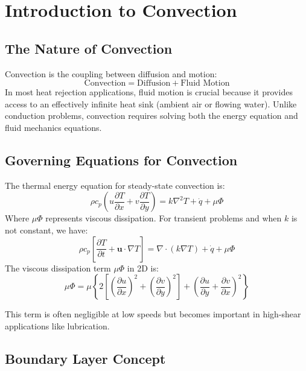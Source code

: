 \section*{Introduction to Convection}
\subsection*{The Nature of Convection}
Convection is the coupling between diffusion and motion:
\[
\text{Convection} = \text{Diffusion} + \text{Fluid Motion}
\]
%
In most heat rejection applications, fluid motion is crucial because it provides access to an effectively infinite heat sink (ambient air or flowing water). Unlike conduction problems, convection requires solving both the energy equation and fluid mechanics equations.
\subsection*{Governing Equations for Convection}
\begin{definition}
The thermal energy equation for steady-state convection is:
\[
    \rho c_p \left(u\frac{\partial T}{\partial x} + v\frac{\partial T}{\partial y}\right) = k\nabla^2 T + \dot{q} + \mu\Phi
\]
%
Where $\mu\Phi$ represents viscous dissipation. For transient problems and when $k$ is not constant, we have:
\[
    \rho c_p \left[\frac{\partial T}{\partial t} + \mathbf{u}\cdot \nabla T\right] = \nabla \cdot(k\nabla T) + \dot{q} + \mu\Phi
\]
%
The viscous dissipation term $\mu\Phi$ in 2D is:
\[
    \mu\Phi = \mu\left\{2 \left[ 
    \left(\frac{\partial u}{\partial x}\right)^2 + \left(\frac{\partial v}{\partial y}\right)^2 \right] 
    + \left(\frac{\partial u}{\partial y} + \frac{\partial v}{\partial x}\right)^2\right\}
\]

This term is often negligible at low speeds but becomes important in high-shear applications like lubrication.
\end{definition}
\subsection*{Boundary Layer Concept}

